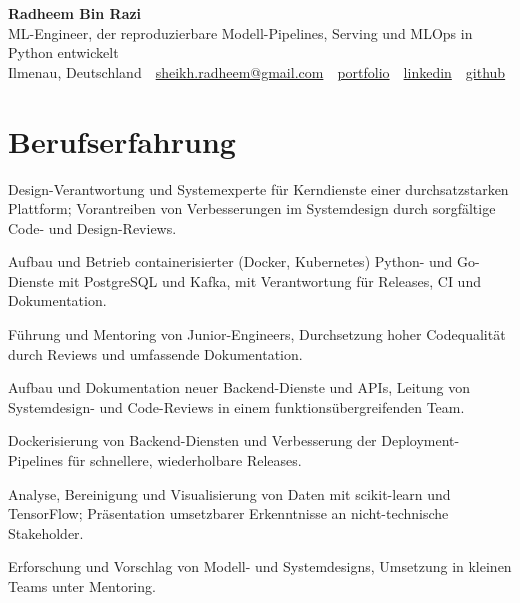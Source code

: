 \documentclass[11pt,a4paper]{resume}
\makeatletter
\newcommand{\Portfolio}{https://radheem.github.io/my-cv}
\newcommand{\PortfolioText}{portfolio}
\newcommand{\GitHub}{https://github.com/radheem}
\newcommand{\LinkedIn}{https://www.linkedin.com/in/radheem-razi}
\newcommand{\Email}{sheikh.radheem@gmail.com}
\makeatother
\begin{document}
\clearpage
{}

\begin{center}
  {\huge\bfseries Radheem Bin Razi}\\[3pt]
  {\large ML-Engineer, der reproduzierbare Modell-Pipelines, Serving und MLOps in Python entwickelt}\\[6pt]
  \small
  Ilmenau, Deutschland \,\textbar\,
  \href{mailto:\Email}{\Email} \,\textbar\,
  \href{\Portfolio}{\PortfolioText} \,\textbar\,
  \href{\LinkedIn}{linkedin} \,\textbar\,
  \href{\GitHub}{github}
\end{center}
\vspace{2pt}

\section{Berufserfahrung}

\bullets
  \item Design-Verantwortung und Systemexperte für Kerndienste einer durchsatzstarken Plattform; Vorantreiben von Verbesserungen im Systemdesign durch sorgfältige Code- und Design-Reviews.
  \item Aufbau und Betrieb containerisierter (Docker, Kubernetes) Python- und Go-Dienste mit PostgreSQL und Kafka, mit Verantwortung für Releases, CI und Dokumentation.
  \item Führung und Mentoring von Junior-Engineers, Durchsetzung hoher Codequalität durch Reviews und umfassende Dokumentation.
\bulletsend
\vspace{3pt}
\bullets
  \item Aufbau und Dokumentation neuer Backend-Dienste und APIs, Leitung von Systemdesign- und Code-Reviews in einem funktionsübergreifenden Team.
  \item Dockerisierung von Backend-Diensten und Verbesserung der Deployment-Pipelines für schnellere, wiederholbare Releases.
\bulletsend
\vspace{3pt}
\bullets
  \item Analyse, Bereinigung und Visualisierung von Daten mit scikit-learn und TensorFlow; Präsentation umsetzbarer Erkenntnisse an nicht-technische Stakeholder.
  \item Erforschung und Vorschlag von Modell- und Systemdesigns, Umsetzung in kleinen Teams unter Mentoring.
\bulletsend
\vspace{3pt}
\end{document}

